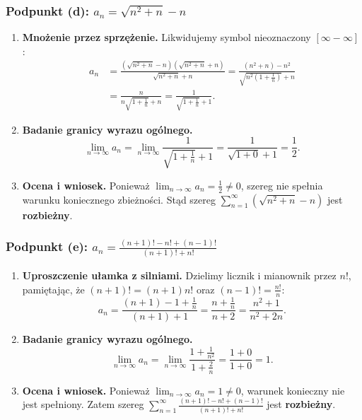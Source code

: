 \subsubsection*{Podpunkt (d): $\displaystyle a_n = \sqrt{n^2+n} - n$}

\begin{enumerate}[label=\textbf{Krok \arabic*.},leftmargin=*]
    \item \textbf{Mnożenie przez sprzężenie.}
    Likwidujemy symbol nieoznaczony $[\infty - \infty]$:
    \begin{align*}
        a_n &= \frac{(\sqrt{n^2+n} - n)(\sqrt{n^2+n} + n)}{\sqrt{n^2+n} + n} = \frac{(n^2+n) - n^2}{\sqrt{n^2(1 + \frac{1}{n})} + n} \\
        &= \frac{n}{n\sqrt{1 + \frac{1}{n}} + n} = \frac{1}{\sqrt{1 + \frac{1}{n}} + 1}.
    \end{align*}
    \item \textbf{Badanie granicy wyrazu ogólnego.}
    \begin{equation*}
        \lim_{n \to \infty} a_n = \lim_{n \to \infty} \frac{1}{\sqrt{1 + \frac{1}{n}} + 1} = \frac{1}{\sqrt{1+0} + 1} = \frac{1}{2}.
    \end{equation*}
    \item \textbf{Ocena i wniosek.}
    Ponieważ $\lim_{n \to \infty} a_n = \frac{1}{2} \neq 0$, szereg nie spełnia warunku koniecznego zbieżności. Stąd szereg $\displaystyle\sum_{n=1}^{\infty} \left(\sqrt{n^2+n} - n\right)$ jest \textbf{rozbieżny}.
\end{enumerate}

\subsubsection*{Podpunkt (e): $\displaystyle a_n = \frac{(n+1)! - n! + (n-1)!}{(n+1)! + n!}$}

\begin{enumerate}[label=\textbf{Krok \arabic*.},leftmargin=*]
    \item \textbf{Uproszczenie ułamka z silniami.}
    Dzielimy licznik i mianownik przez $n!$, pamiętając, że $(n+1)! = (n+1)n!$ oraz $(n-1)! = \frac{n!}{n}$:
    \begin{equation*}
        a_n = \frac{(n+1) - 1 + \frac{1}{n}}{(n+1) + 1} = \frac{n + \frac{1}{n}}{n + 2} = \frac{n^2 + 1}{n^2 + 2n}.
    \end{equation*}
    \item \textbf{Badanie granicy wyrazu ogólnego.}
    \begin{equation*}
        \lim_{n \to \infty} a_n = \lim_{n \to \infty} \frac{1 + \frac{1}{n^2}}{1 + \frac{2}{n}} = \frac{1+0}{1+0} = 1.
    \end{equation*}
    \item \textbf{Ocena i wniosek.}
    Ponieważ $\lim_{n \to \infty} a_n = 1 \neq 0$, warunek konieczny nie jest spełniony. Zatem szereg $\displaystyle\sum_{n=1}^{\infty} \frac{(n+1)! - n! + (n-1)!}{(n+1)! + n!}$ jest \textbf{rozbieżny}.
\end{enumerate}

